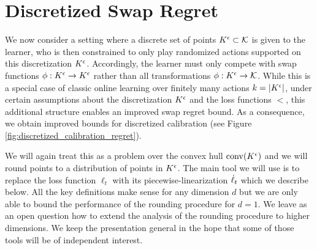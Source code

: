 \documentclass[final,12pt]{alt2025}
\begin{document}
    





















































\section{Discretized Swap Regret}\label{sec:discretized_swap_regret}

We now consider a setting where a discrete set of points $K^{\epsilon} \subset \mathcal{K}$ is given to the learner, who is then constrained to only play randomized actions supported on this discretization $K^{\epsilon}$.  Accordingly, the learner must only compete with swap functions $\phi: K^{\epsilon} \rightarrow K^{\epsilon}$ rather than all transformations $\phi: K^{\epsilon} \to \mathcal{K}$. While this is a special case of classic online learning over finitely many actions $k=\left|K^{\epsilon}\right|$, under certain assumptions about the discretization $K^{\epsilon}$ and the loss functions $\lt$, this additional structure enables an improved swap regret bound.  As a consequence, we obtain improved bounds for discretized calibration (see Figure \ref{fig:discretized_calibration_regret}).

We will again treat this as a problem over the convex hull $\mathrm{conv}(K^{\epsilon})$ and we will round points to a distribution of points in $K^{\epsilon}$. The main tool we will use is to replace the loss function $\ell_t$ with its piecewise-linearization $\dot{\ell}_t$ which we describe below. All the key definitions make sense for any dimension $d$ but we are only able to bound the performance of the rounding procedure for $d=1$. We leave as an open question how to extend the analysis of the rounding procedure to higher dimensions. We keep the presentation general in the hope that some of those tools will be of independent interest.
\end{document}
